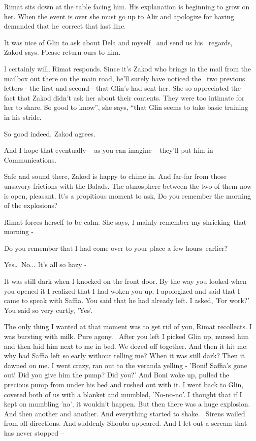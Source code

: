 \documentclass[12pt]{book}
\begin{document}
Rimat sits down at the table facing him. His explanation is beginning to grow on her. When the event is over she must go
up to Alir and apologize for having demanded that he~correct{ }that last line.

{\textquotedbl}It was nice of Glin to ask about Dela and{ }myself \ and send us his~
regards,{\textquotedbl} Zakod says. {\textquotedbl}Please return ours to him.{\textquotedbl}

{\textquotedbl}I certainly will,{\textquotedbl} Rimat responds. Since it's Zakod who brings in the mail from the mailbox
out there on the main road, he'll surely have noticed the \ two previous letters - the first and second - that Glin's
had sent her. She so appreciated the fact that Zakod didn't ask her about their contents. They were too intimate for
her to share. {\textquotedbl}So good to know'', she says, ``that Glin seems to take basic training in his
stride.{\textquotedbl}

{\textquotedbl}So good indeed,{\textquotedbl} Zakod agrees.

{\textquotedbl}And I hope that eventually -- as you can imagine -- they'll put him in Communications.{\textquotedbl}

{\textquotedbl}Safe and sound there,{\textquotedbl} Zakod is happy to chime in. {\textquotedbl}And far-far from those
unsavory frictions with the Balads.{\textquotedbl} The atmosphere between the two of them now is open, pleasant. It's a
propitious moment to ask, {\textquotedbl}Do you remember the morning of the explosions?{\textquotedbl}

Rimat forces herself to be calm. She says, {\textquotedbl}I mainly remember my shrieking~that morning -{\textquotedbl}

{\textquotedbl}Do you remember that I had come over to your place a few hours~earlier?{\textquotedbl}

{\textquotedbl}Yes{\dots} No... It's all so hazy -{\textquotedbl}

{\textquotedbl}It was still dark when I knocked on the front door. By the way you looked when you opened it I realized
that I had woken you up. I apologized and said that I came to speak with Saffia. You said that he had already left. I
asked, 'For work?' You said so very curtly, 'Yes'.{\textquotedbl}

{\textquotedbl}The only thing I wanted{ }at that moment was to get rid of
you,{\textquotedbl} Rimat recollects. {\textquotedbl}I was bursting with milk. Pure agony. ~After you left I picked
Glin up, nursed{ }him and then laid him next to me in bed. We dozed off together. And then it hit me:
why had Saffia left so early without telling me? When it was still dark? Then it dawned{ }on me. I went
crazy, ran out to the veranda yelling - 'Boni! Saffia's gone out! Did you give him the pump? Did you?' And Boni woke
up, pulled the precious pump from under his bed and rushed out with it. I went back to Glin, covered both of us with a
blanket and mumbled, 'No-no-no'. I thought that if I kept on mumbling 'no', it wouldn't happen. But then there was a
huge explosion. And then another and another. And everything started to shake. \ Sirens wailed from all directions. And
suddenly Shouba appeared. And I let out a scream that has never stopped --{\textquotedbl}
\end{document}

